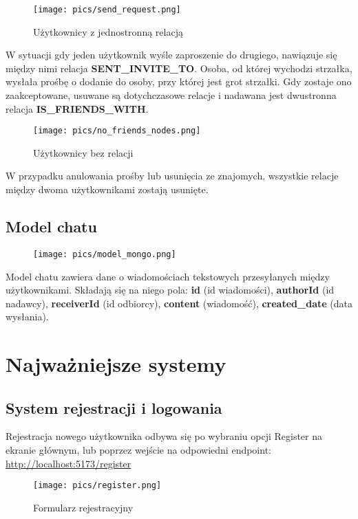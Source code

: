 \documentclass{article}
\begin{document}
\begin{figure}[h]
    \centering
    \texttt{[image: pics/send\_request.png]}
    \caption*{Użytkownicy z jednostronną relacją}
\end{figure}

W sytuacji gdy jeden użytkownik wyśle zaproszenie do drugiego, nawiązuje się między nimi relacja \textbf{SENT\_INVITE\_TO}. Osoba, od której wychodzi strzałka, wysłała prośbę o dodanie do osoby, przy której jest grot strzałki.
Gdy zostaje ono zaakceptowane, usuwane są dotychczasowe relacje i nadawana jest dwustronna relacja \textbf{IS\_FRIENDS\_WITH}.

\begin{figure}[ht]
    \centering
    \texttt{[image: pics/no\_friends\_nodes.png]}
    \caption*{Użytkownicy bez relacji}
\end{figure}

W przypadku anulowania prośby lub usunięcia ze znajomych, wszystkie relacje między dwoma użytkownikami zostają usunięte.

\subsection{Model chatu}
\begin{figure}[h]
    \centering
    \texttt{[image: pics/model\_mongo.png]}
\end{figure}

Model chatu zawiera dane o wiadomościach tekstowych przesyłanych między użytkownikami. Składają się na niego pola: \textbf{id} (id wiadomości), \textbf{authorId} (id nadawcy), \textbf{receiverId} (id odbiorcy), \textbf{content} (wiadomość), \textbf{created\_date} (data wysłania). 

\newpage
\section{Najważniejsze systemy}
\subsection{System rejestracji i logowania}

Rejestracja nowego użytkownika odbywa się po wybraniu opcji Register na ekranie głównym, lub poprzez wejście na odpowiedni endpoint: \\
\url{http://localhost:5173/register}

\begin{figure}[h]
    \centering
    \texttt{[image: pics/register.png]}
    \caption*{Formularz rejestracyjny}
\end{figure}
\end{document}
